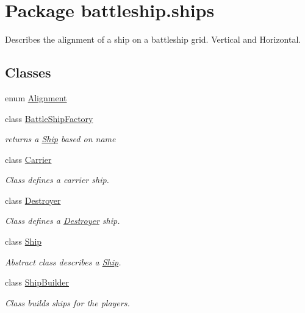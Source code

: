 \hypertarget{namespacebattleship_1_1ships}{}\section{Package battleship.\+ships}
\label{namespacebattleship_1_1ships}


Describes the alignment of a ship on a battleship grid. Vertical and Horizontal.  


\subsection*{Classes}
\begin{DoxyCompactItemize}
\item 
enum \hyperlink{enumbattleship_1_1ships_1_1Alignment}{Alignment}
\item 
class \hyperlink{classbattleship_1_1ships_1_1BattleShipFactory}{Battle\+Ship\+Factory}
\begin{DoxyCompactList}\small\item\em returns a \hyperlink{classbattleship_1_1ships_1_1Ship}{Ship} based on name \end{DoxyCompactList}\item 
class \hyperlink{classbattleship_1_1ships_1_1Carrier}{Carrier}
\begin{DoxyCompactList}\small\item\em Class defines a carrier ship. \end{DoxyCompactList}\item 
class \hyperlink{classbattleship_1_1ships_1_1Destroyer}{Destroyer}
\begin{DoxyCompactList}\small\item\em Class defines a \hyperlink{classbattleship_1_1ships_1_1Destroyer}{Destroyer} ship. \end{DoxyCompactList}\item 
class \hyperlink{classbattleship_1_1ships_1_1Ship}{Ship}
\begin{DoxyCompactList}\small\item\em Abstract class describes a \hyperlink{classbattleship_1_1ships_1_1Ship}{Ship}. \end{DoxyCompactList}\item 
class \hyperlink{classbattleship_1_1ships_1_1ShipBuilder}{Ship\+Builder}
\begin{DoxyCompactList}\small\item\em Class builds ships for the players. \end{DoxyCompactList}\item 

\end{DoxyCompactItemize}
